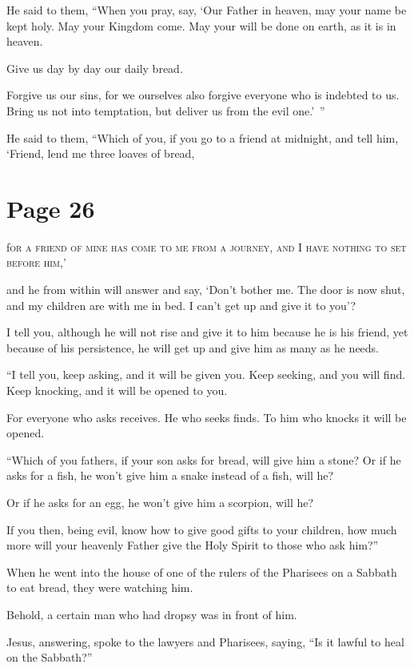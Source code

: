 He said to them, “When you pray, say, ‘Our Father in heaven, may your name be kept holy. May your Kingdom come. May your will be done on earth, as it is in heaven.

Give us day by day our daily bread.

Forgive us our sins, for we ourselves also forgive everyone who is indebted to us. Bring us not into temptation, but deliver us from the evil one.’ ”

He said to them, “Which of you, if you go to a friend at midnight, and tell him, ‘Friend, lend me three loaves of bread,



\chapterornament
\section*{Page 26}

\lettrine{f}{or a friend of mine has come to me from a journey, and I have nothing to set before him,’}

and he from within will answer and say, ‘Don’t bother me. The door is now shut, and my children are with me in bed. I can’t get up and give it to you’?

I tell you, although he will not rise and give it to him because he is his friend, yet because of his persistence, he will get up and give him as many as he needs.

“I tell you, keep asking, and it will be given you. Keep seeking, and you will find. Keep knocking, and it will be opened to you.

For everyone who asks receives. He who seeks finds. To him who knocks it will be opened.

“Which of you fathers, if your son asks for bread, will give him a stone? Or if he asks for a fish, he won’t give him a snake instead of a fish, will he?

Or if he asks for an egg, he won’t give him a scorpion, will he?

If you then, being evil, know how to give good gifts to your children, how much more will your heavenly Father give the Holy Spirit to those who ask him?”

When he went into the house of one of the rulers of the Pharisees on a Sabbath to eat bread, they were watching him.

Behold, a certain man who had dropsy was in front of him.

Jesus, answering, spoke to the lawyers and Pharisees, saying, “Is it lawful to heal on the Sabbath?”


